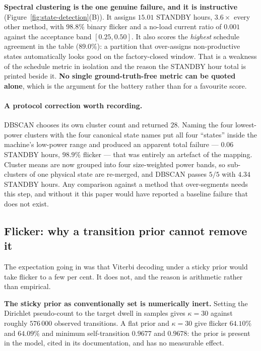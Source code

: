 \textbf{Spectral clustering is the one genuine failure, and it is
instructive} (Figure~\ref{fig:state-detection}(B)). It assigns $15.01$
STANDBY hours, $3.6\times$ every other
method, with $98.8\%$ binary flicker and a no-load current ratio of
$0.001$ against the acceptance band $[0.25,0.50]$. It also scores the
\emph{highest} schedule agreement in the table ($89.0\%$): a partition
that over-assigns non-productive states automatically looks good on the
factory-closed window. That is a weakness of the schedule metric in
isolation and the reason the STANDBY hour total is printed beside it.
\textbf{No single ground-truth-free metric can be quoted alone}, which
is the argument for the battery rather than for a favourite score.

\paragraph{A protocol correction worth recording.}
DBSCAN chooses its own cluster count and returned $28$. Naming the four
lowest-power clusters with the four canonical state names put all four
``states'' inside the machine's low-power range and produced an apparent
total failure --- $0.06$ STANDBY hours, $98.9\%$ flicker --- that was
entirely an artefact of the mapping. Cluster means are now grouped into
four size-weighted power bands, so sub-clusters of one physical state
are re-merged, and DBSCAN passes $5/5$ with $4.34$ STANDBY hours. Any
comparison against a method that over-segments needs this step, and
without it this paper would have reported a baseline failure that does
not exist.

\subsection{Flicker: why a transition prior cannot remove it}
\label{sec:flicker}

The expectation going in was that Viterbi decoding under a sticky prior
would take flicker to a few per cent. It does not, and the reason is
arithmetic rather than empirical.

\textbf{The sticky prior as conventionally set is numerically inert.}
Setting the Dirichlet pseudo-count to the target dwell in samples gives
$\kappa=30$ against roughly $576\,000$ observed transitions. A flat
prior and $\kappa=30$ give flicker $64.10\%$ and $64.09\%$ and minimum
self-transition $0.9677$ and $0.9678$: the prior is present in the
model, cited in its documentation, and has no measurable effect.

